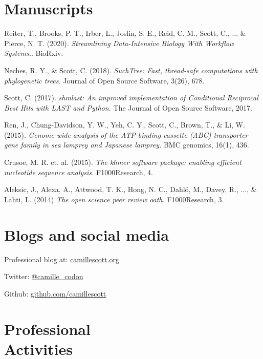 \documentclass[margin,12pt]{camille_resume}
\begin{document}
\begin{resume}


\section{\mysidestyle Manuscripts}

Reiter, T., Brooks, P. T., Irber, L., Joslin, S. E., Reid, C. M., Scott, C., ... \& Pierce, N. T. (2020). {\em Streamlining Data-Intensive Biology With Workflow Systems.}. BioRxiv.

Neches, R. Y., \& Scott, C. (2018). {\em SuchTree: Fast, thread-safe computations with phylogenetic trees.} Journal of Open Source Software, 3(26), 678.

Scott, C. (2017). {\em shmlast: An improved implementation of Conditional Reciprocal Best Hits with LAST and Python.} The Journal of Open Source Software, 2017.

Ren, J., Chung-Davidson, Y. W., Yeh, C. Y., Scott, C., Brown, T., \& Li, W. (2015). {\em Genome-wide analysis of the ATP-binding cassette (ABC) transporter gene family in sea lamprey and Japanese lamprey.} BMC genomics, 16(1), 436.

Crusoe, M. R. et. al. (2015). {\em The khmer software package: enabling efficient nucleotide sequence analysis.} F1000Research, 4.

Aleksic, J., Alexa, A., Attwood, T. K., Hong, N. C., Dahlö, M., Davey, R., ..., \& Lahti, L. (2014)
{\em The open science peer review oath.} F1000Research, 3.

\section{\mysidestyle Blogs and social media}

Professional blog at: \href{http://camillescott.org}{camillescott.org}  

Twitter: \href{http://twitter.com/camille\_codon}{@camille\_codon}

Github: \href{https://github.com/camillescott}{github.com/camillescott}

\pagebreak

    \section{\mysidestyle Professional\\Activities}


\end{resume}
\end{document}

